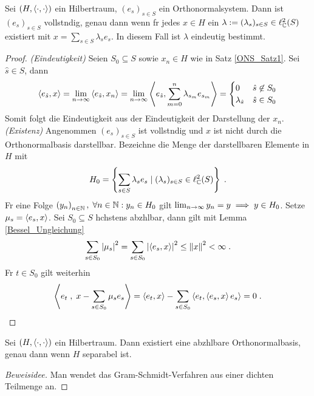 \begin{theorem}
Sei \((H,\left\langle\cdot, \cdot\right\rangle)\) ein Hilbertraum, \((e_s)_{s\in S}\) ein Orthonormalsystem. Dann ist \((e_s)_{s\in S}\) vollst\as ndig, genau dann wenn f\us r jedes \(x\in H\) ein \(\lambda := (\lambda_s)_{s\in S} \in \ell_{\mathbb{C}}^2(S)\) existiert mit \(x = \sum_{s\in S} \lambda_s e_s\). In diesem Fall ist \(\lambda\) eindeutig bestimmt.
\end{theorem}
\begin{proof}
	\textit{(Eindeutigkeit)} Seien \(S_0 \subseteq S\) sowie \(x_n \in H\) wie in Satz \ref{ONS_Satz1}. Sei \(\hat s \in S\), dann
	\[\left\langle e_{\hat s}, x\right\rangle = \lim_{n \to\infty} \left\langle e_{\hat s}, x_n\right\rangle = \lim_{n \to\infty} \left\langle e_{\hat s}, \sum_{m=0}^n \lambda_{s_m} e_{s_m}\right\rangle= \begin{cases}0 & \hat s\not\in S_0 \\ \lambda_{\hat s} & \hat s \in S_0\end{cases}\]
	Somit folgt die Eindeutigkeit aus der Eindeutigkeit der Darstellung der \(x_n\).\\
	\textit{(Existenz)}
	Angenommen \((e_s)_{s\in S} \) ist vollst\as ndig und \(x\) ist nicht durch die Orthonormalbasis darstellbar. Bezeichne die Menge der darstellbaren Elemente in $H$ mit
	\[H_0 = \left\{\sum_{s\in S} \lambda_s e_s \;\vert\; (\lambda_s)_{s\in S} \in \ell^2_{\mathbb{C}}(S)\right\}\;.\]	
	F\us r eine Folge \(\left (y_n\right )_{n\in \mathbb{N}},\; \forall n \in \mathbb{N}: y_n \in H_0\) gilt \(\lim_{n \to \infty} y_n = y \implies y \in H_0\). Setze \(\mu_s = \left\langle e_s, x\right\rangle\). Sei \(S_0 \subseteq S\) h\os chstens abz\as hlbar, dann gilt mit Lemma \ref{Bessel_Ungleichung}
	\[\sum_{s\in S_0} \left\lvert \mu_s \right\rvert^2 = \sum_{s\in S_0} \left\lvert \left\langle e_s, x\right\rangle \right\rvert^2 \leq \left\lVert x\right\rVert^2 < \infty\;.\]
	F\us r \(t\in S_0\) gilt weiterhin
	\[\left\langle e_t\;, \;x - \sum_{s\in S_0} \mu_s e_s\right\rangle = \left\langle e_t,x\right\rangle - \sum_{s\in S_0} \left\langle e_t,\left\langle e_s, x\right\rangle e_s\right\rangle = 0 \;. \]
\end{proof}

\begin{theorem}
	Sei \((H,\left\langle\cdot, \cdot\right\rangle)\) ein Hilbertraum. Dann existiert eine abz\as hlbare Orthonormalbasis, genau dann wenn $H$ separabel ist. 
\end{theorem}
\begin{proof}[Beweisidee]
	Man wendet das Gram-Schmidt-Verfahren aus einer dichten Teilmenge an.
\end{proof}

